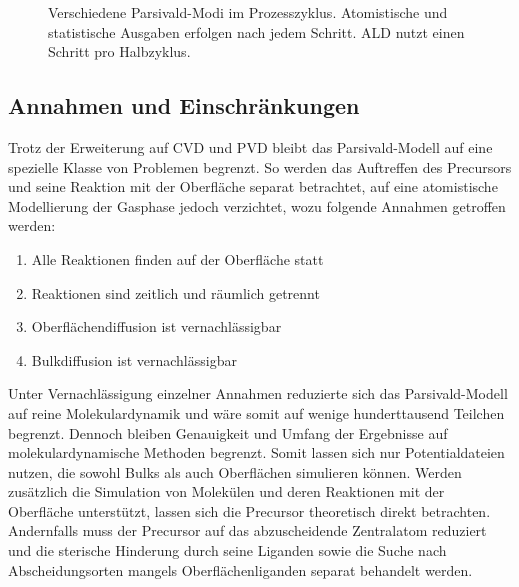 \begin{figure}
  \captionsetup[subfigure]{singlelinecheck=false}
  \begin{subfigure}[t]{5.7cm}
    \def\svgwidth{\textwidth}
    
  \end{subfigure}
  \hfill
  \begin{subfigure}[t]{4.7cm}
    \def\svgwidth{\textwidth}
    
  \end{subfigure}
  \hfill
  \begin{subfigure}[t]{3cm}
    \def\svgwidth{\textwidth}
    
  \end{subfigure}
  \caption[Parsivald-Modi]{
    Verschiedene Parsivald-Modi im Prozesszyklus.
    Atomistische und statistische Ausgaben erfolgen nach jedem Schritt.
    ALD nutzt einen Schritt pro Halbzyklus.
  }
  \label{fig:parsivald-modes}
\end{figure}

\subsection{Annahmen und Einschränkungen}

Trotz der Erweiterung auf CVD und PVD bleibt das Parsivald-Modell auf eine spezielle Klasse von Problemen begrenzt.
So werden das Auftreffen des Precursors und seine Reaktion mit der Oberfläche separat betrachtet, auf eine atomistische Modellierung der Gasphase jedoch verzichtet, wozu folgende Annahmen getroffen werden:

\begin{enumerate}
\item Alle Reaktionen finden auf der Oberfläche statt
\item Reaktionen sind zeitlich und räumlich getrennt
\item Oberflächendiffusion ist vernachlässigbar
\item Bulkdiffusion ist vernachlässigbar
\end{enumerate}

Unter Vernachlässigung einzelner Annahmen reduzierte sich das Parsivald-Modell auf reine Molekulardynamik und wäre somit auf wenige hunderttausend Teilchen begrenzt.
Dennoch bleiben Genauigkeit und Umfang der Ergebnisse auf molekulardynamische Methoden begrenzt.
Somit lassen sich nur Potentialdateien nutzen, die sowohl Bulks als auch Oberflächen simulieren können.
Werden zusätzlich die Simulation von Molekülen und deren Reaktionen mit der Oberfläche unterstützt, lassen sich die Precursor theoretisch direkt betrachten.
Andernfalls muss der Precursor auf das abzuscheidende Zentralatom reduziert und die sterische Hinderung durch seine Liganden sowie die Suche nach Abscheidungsorten mangels Oberflächenliganden separat behandelt werden.

